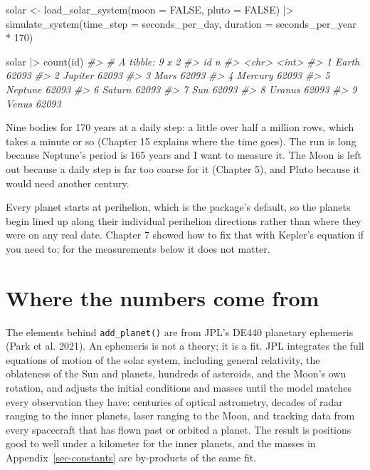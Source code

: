 \documentclass[
  10.5pt,
  letterpaper,
]{scrbook}
\newenvironment{Shaded}{\begin{snugshade}}{\end{snugshade}}
\newcommand{\AttributeTok}[1]{\textcolor[rgb]{0.00,0.00,0.00}{#1}}
\newcommand{\CommentTok}[1]{\textcolor[rgb]{0.00,0.00,0.00}{\textit{#1}}}
\newcommand{\ConstantTok}[1]{\textcolor[rgb]{0.00,0.00,0.00}{#1}}
\newcommand{\DecValTok}[1]{\textcolor[rgb]{0.00,0.00,0.00}{#1}}
\newcommand{\FunctionTok}[1]{\textcolor[rgb]{0.00,0.00,0.00}{#1}}
\newcommand{\NormalTok}[1]{\textcolor[rgb]{0.00,0.00,0.00}{#1}}
\newcommand{\OtherTok}[1]{\textcolor[rgb]{0.00,0.00,0.00}{#1}}
\newcommand{\SpecialCharTok}[1]{\textcolor[rgb]{0.00,0.00,0.00}{#1}}
\theoremstyle{definition}
\theoremstyle{plain}
\theoremstyle{remark}
\begin{document}
\begin{Shaded}
\begin{Highlighting}[]
\NormalTok{solar }\OtherTok{\textless{}{-}} \FunctionTok{load\_solar\_system}\NormalTok{(}\AttributeTok{moon =} \ConstantTok{FALSE}\NormalTok{, }\AttributeTok{pluto =} \ConstantTok{FALSE}\NormalTok{) }\SpecialCharTok{|\textgreater{}}
  \FunctionTok{simulate\_system}\NormalTok{(}\AttributeTok{time\_step =}\NormalTok{ seconds\_per\_day, }\AttributeTok{duration =}\NormalTok{ seconds\_per\_year }\SpecialCharTok{*} \DecValTok{170}\NormalTok{)}

\NormalTok{solar }\SpecialCharTok{|\textgreater{}} \FunctionTok{count}\NormalTok{(id)}
\CommentTok{\#\textgreater{} \# A tibble: 9 x 2}
\CommentTok{\#\textgreater{}   id          n}
\CommentTok{\#\textgreater{}   \textless{}chr\textgreater{}   \textless{}int\textgreater{}}
\CommentTok{\#\textgreater{} 1 Earth   62093}
\CommentTok{\#\textgreater{} 2 Jupiter 62093}
\CommentTok{\#\textgreater{} 3 Mars    62093}
\CommentTok{\#\textgreater{} 4 Mercury 62093}
\CommentTok{\#\textgreater{} 5 Neptune 62093}
\CommentTok{\#\textgreater{} 6 Saturn  62093}
\CommentTok{\#\textgreater{} 7 Sun     62093}
\CommentTok{\#\textgreater{} 8 Uranus  62093}
\CommentTok{\#\textgreater{} 9 Venus   62093}
\end{Highlighting}
\end{Shaded}

Nine bodies for 170 years at a daily step: a little over half a million
rows, which takes a minute or so (Chapter 15 explains where the time
goes). The run is long because Neptune's period is 165 years and I want
to measure it. The Moon is left out because a daily step is far too
coarse for it (Chapter 5), and Pluto because it would need another
century.

Every planet starts at perihelion, which is the package's default, so
the planets begin lined up along their individual perihelion directions
rather than where they were on any real date. Chapter 7 showed how to
fix that with Kepler's equation if you need to; for the measurements
below it does not matter.

\section{Where the numbers come from}\label{where-the-numbers-come-from}

The elements behind \texttt{add\_planet()} are from JPL's DE440
planetary ephemeris (Park et al. 2021). An ephemeris is not a theory; it
is a fit. JPL integrates the full equations of motion of the solar
system, including general relativity, the oblateness of the Sun and
planets, hundreds of asteroids, and the Moon's own rotation, and adjusts
the initial conditions and masses until the model matches every
observation they have: centuries of optical astrometry, decades of radar
ranging to the inner planets, laser ranging to the Moon, and tracking
data from every spacecraft that has flown past or orbited a planet. The
result is positions good to well under a kilometer for the inner
planets, and the masses in Appendix~\ref{sec-constants} are by-products
of the same fit.
\end{document}
